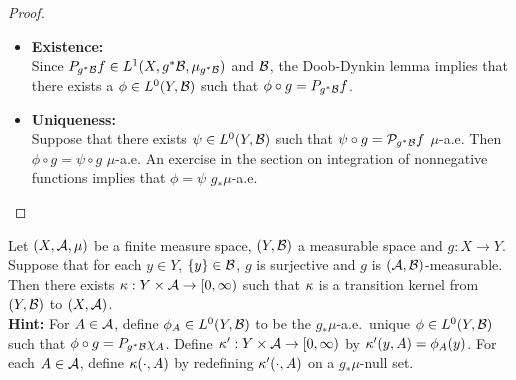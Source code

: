 \documentclass{book}
\begin{document}
	\begin{proof}\
		\begin{itemize}
			\item \textbf{Existence:} \\
			Since $P_{g^*\mathcal{B}}f \in L^1(X, g^*\mathcal{B}, \mu_{g^*\mathcal{B}})$ and $\mathcal{B}$, the Doob-Dynkin lemma implies that there exists a $\phi \in L^0(Y, \mathcal{B})$ such that $\phi \circ g = P_{g^*\mathcal{B}}f$.
			\item \textbf{Uniqueness:} \\
			Suppose that there exists $\psi \in L^0(Y, \mathcal{B})$ such that $\psi \circ g = \mathcal{P}_{g^*\mathcal{B}}f$ $\mu$-a.e. Then $\phi \circ g = \psi \circ g$ $\mu$-a.e. An exercise in the section on integration of nonnegative functions implies that $\phi = \psi$ $g_*\mu$-a.e.
		\end{itemize} 
	\end{proof}
	
	\begin{ex}
		Let $(X, \mathcal{A}, \mu)$ be a finite measure space, $(Y, \mathcal{B})$ a measurable space and $g: X \rightarrow Y$. Suppose that for each $y \in Y$, $\{y\} \in \mathcal{B}$, $g$ is surjective and $g$ is $(\mathcal{A}, \mathcal{B})$-measurable. Then there exists $\kappa: Y \times \mathcal{A} \rightarrow [0,\infty)$ such that $\kappa$ is a transition kernel from $(Y, \mathcal{B})$ to $(X, \mathcal{A})$.\\
		\textbf{Hint:} For $A \in \mathcal{A}$, define $\phi_A \in L^0(Y, \mathcal{B} )$ to be the $g_*\mu$-a.e.\ unique $\phi \in L^0(Y, \mathcal{B})$ such that $\phi \circ g = P_{g^*\mathcal{B}} \chi_A$. Define $\kappa': Y \times \mathcal{A} \rightarrow [0,\infty)$ by $\kappa'(y, A) = \phi_A(y)$. For each $A \in \mathcal{A}$, define $\kappa(\cdot, A)$ by redefining $\kappa'(\cdot, A)$ on a $g_*\mu$-null set.
	\end{ex}
	
\end{document}
